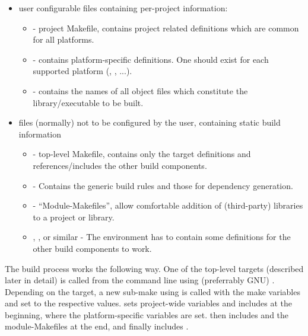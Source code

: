 \begin{itemize}
  \item user configurable files containing per-project information:
    \begin{itemize}
    \item {} - project Makefile, contains project related definitions which are common for all platforms.
    \item {} - contains platform-specific definitions. One should exist for each supported platform (, , ...).
    \item {} - contains the names of all object files which constitute the library/executable to be built.
    \end{itemize}
    
  \item files (normally) not to be configured by the user, containing static build information
    \begin{itemize}
    \item {} - top-level Makefile, contains only the target definitions and references/includes the other build components.
    \item {} - Contains the generic build rules and those for dependency generation.
    \item {} - ``Module-Makefiles'', allow comfortable addition of (third-party) libraries to a project or library.
    \item {}, ,  or similar - The environment has to contain some definitions for the other build components to work.
    \end{itemize}
\end{itemize}

The build process works the following way. One of the top-level targets (described later in detail) is called from the command line using (preferrably GNU) .
Depending on the target, a new sub-make using  is called with the make variables  and  set to the respective values.
 sets project-wide variables and includes  at the beginning, where the platform-specific variables are set.
 then includes  and the module-Makefiles at the end, and finally includes .


